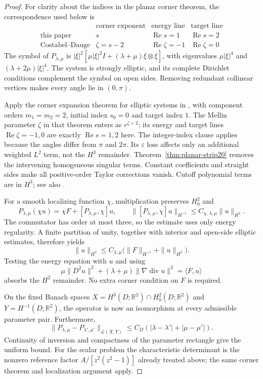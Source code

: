 \documentclass[11pt,a4paper]{article}
\theoremstyle{remark}
\numberwithin{equation}{section}
\begin{document}
\begin{proof}
For clarity about the indices in the planar corner theorem, the
correspondence used below is
\[
 \begin{array}{c|c|c|c}
 &\text{corner exponent}&\text{energy line}&\text{target line}\\\hline
 \text{this paper}&s&\operatorname{Re}s=1&\operatorname{Re}s=2\\
 \text{Costabel--Dauge}&\zeta=s-2&\operatorname{Re}\zeta=-1&
                 \operatorname{Re}\zeta=0
 \end{array}
\]
The symbol of $P_{\lambda,\mu}$ is
$|\xi|^2[\mu|\xi|^2I+(\lambda+\mu)\xi\otimes\xi]$, with eigenvalues
$\mu|\xi|^4$ and $(\lambda+2\mu)|\xi|^4$. The system is strongly elliptic,
and its complete Dirichlet conditions complement the symbol on open sides.
Removing redundant collinear vertices makes every angle lie in $(0,\pi)$.

Apply the corner expansion theorem for elliptic systems in
\cite[Theorem~1.1(ii) and Sections~1.c, 2.a]{CostabelDauge1994}, with
component orders $m_1=m_2=2$, initial index $s_0=0$ and target index $1$.
The Mellin parameter $\zeta$ in that theorem enters as $r^{\zeta+2}$;
its energy and target lines $\operatorname{Re}\zeta=-1,0$ are exactly
$\operatorname{Re}s=1,2$ here. The integer-index clause applies because
the angles differ from $\pi$ and $2\pi$. Its $\varepsilon$ loss affects
only an additional weighted $L^2$ term, not the $H^3$ remainder.
Theorem~\ref{thm:planar-strip20} removes the intervening homogeneous
singular terms. Constant coefficients and straight sides make all
positive-order Taylor corrections vanish. Cutoff polynomial terms are
in $H^3$; see also \cite[Sections~4.a--b and Remark~4.7(ii)]{CostabelDauge1994}.

For a smooth localizing function $\chi$, multiplication preserves $H_0^2$
and
\[
 P_{\lambda,\mu}(\chi u)=\chi F+[P_{\lambda,\mu},\chi]u,
 \qquad
 \|[P_{\lambda,\mu},\chi]u\|_{H^{-1}}
 \le C_{\chi,\lambda,\mu}\|u\|_{H^2}.
\]
The commutator has order at most three, so the estimate uses only energy
regularity. A finite partition of unity, together with interior and
open-side elliptic estimates, therefore yields
\[
 \|u\|_{H^3}
 \le C_{\lambda,\mu}\bigl(\|F\|_{H^{-1}}+\|u\|_{H^2}\bigr).
\]
Testing the energy equation with $u$ and using
\[
 \mu\|D^2u\|^2+(\lambda+\mu)\|\nabla\operatorname{div}u\|^2
 =\langle F,u\rangle
\]
absorbs the $H^2$ remainder. No extra corner condition on $F$ is required.

On the fixed Banach spaces
$X=H^3(D;\mathbb R^2)\cap H_0^2(D;\mathbb R^2)$ and
$Y=H^{-1}(D;\mathbb R^2)$, the operator is now an isomorphism at every
admissible parameter pair. Furthermore,
\[
 \|P_{\lambda,\mu}-P_{\lambda',\mu'}\|_{\mathcal L(X,Y)}
 \le C_D(|\lambda-\lambda'|+|\mu-\mu'|).
\]
Continuity of inversion and compactness of the parameter rectangle give
the uniform bound. For the scalar problem the characteristic determinant
is the nonzero reference factor $A/[z^2(z^2-1)]$ already treated above;
the same corner theorem and localization argument apply.
\end{proof}
\end{document}
